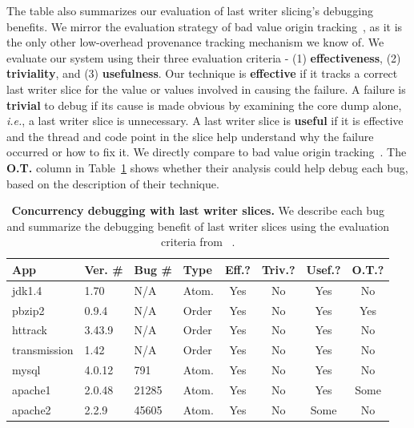 \documentclass[preprint,10pt]{sigplanconf}
\begin{document}
The table also summarizes our evaluation of last writer slicing's debugging
benefits.  We mirror the evaluation strategy of bad value origin
tracking~\cite{badapples}, as it is the only other low-overhead provenance
tracking mechanism we know of.  We evaluate our system using their three
evaluation criteria - (1) {\bf effectiveness}, (2) {\bf triviality}, and (3)
{\bf usefulness}.  Our technique is {\bf effective} if it tracks a correct last
writer slice for the value or values involved in causing the failure.  A failure is {\bf
trivial} to debug if its cause is made obvious by examining the core dump
alone, {\em i.e.}, a last writer slice is unnecessary.  A last writer slice is
{\bf useful} if it is effective and the thread and code point in the slice help
understand why the failure occurred or how to fix it.   We directly compare to
bad value origin tracking~\cite{badapples}.    The {\bf O.T.} column in Table~\ref{tab:bugs}
shows  whether their analysis could help debug each bug, based on the
description of their technique.

\begin{table}
\scriptsize
\centering
\begin{tabular}{l|ll|l|ccc|c}
{\bf App} & {\bf Ver. \#} & {\bf Bug \#} &{\bf Type} & {\bf Eff.?} & {\bf Triv.?} & {\bf Usef.?} & {\bf O.T.?}\\ \hline
jdk1.4 &  1.70   &  N/A     & Atom.  &Yes  &No    &Yes   & No  \\%
pbzip2 &  0.9.4  &  N/A     & Order  &Yes  &No    &Yes   & Yes \\
httrack& 3.43.9  &  N/A     & Order  &Yes  &No    &Yes   & No  \\%
transmission & 1.42 & N/A   & Order  &Yes  &No    &Yes   & No  \\
mysql  &  4.0.12 &  791     & Atom.  &Yes  &No    &Yes   & No  \\%
apache1&  2.0.48 &  21285   & Atom.  &Yes  &No    &Yes   & Some \\%
apache2&  2.2.9 &  45605    & Atom.  &Yes  &No    &Some  & No \\%
\end{tabular}
\caption{\label{tab:bugs}{\bf Concurrency debugging with last writer slices.} We describe each bug and summarize the debugging benefit of last writer slices using the evaluation criteria from ~\cite{badapples}.  }
\normalsize
\end{table}
\end{document}
